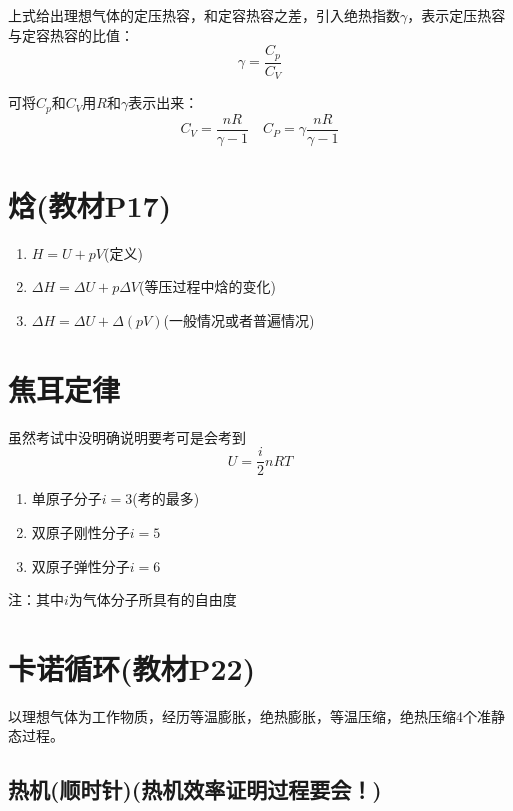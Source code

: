 \documentclass[oneside]{ctexbook}
\begin{document}
上式给出理想气体的定压热容，和定容热容之差，引入绝热指数\(\gamma\)，表示定压热容与定容热容的比值：
\begin{equation}
\gamma=\dfrac{C_p}{C_V}
\end{equation}

可将\(C_p\)和\(C_V\)用\(R\)和\(\gamma\)表示出来：
\begin{equation}
C_V=\dfrac{nR}{\gamma-1}\quad{}C_P=\gamma\dfrac{nR}{\gamma-1}
\end{equation}

\section{焓(教材P17)}
\begin{enumerate}
    \item \(H=U+pV\)(定义)
    \item \(\Delta{}H=\Delta{}U+p\Delta{}V\)(等压过程中焓的变化)
    \item \(\Delta{}H=\Delta{}U+\Delta{}(pV)\)(一般情况或者普遍情况)
\end{enumerate}

\section{焦耳定律}

虽然考试中没明确说明要考可是会考到
\begin{equation}
U=\dfrac{i}{2}nRT
\end{equation}

\begin{enumerate}
    \item 单原子分子\(i=3\)(考的最多)
    \item 双原子刚性分子\(i=5\)
    \item 双原子弹性分子\(i=6\)
\end{enumerate}

注：其中\(i\)为气体分子所具有的自由度

\section{卡诺循环(教材P22)}

以理想气体为工作物质，经历等温膨胀，绝热膨胀，等温压缩，绝热压缩4个准静态过程。

\subsection{热机(顺时针)(热机效率证明过程要会！)}
\end{document}
